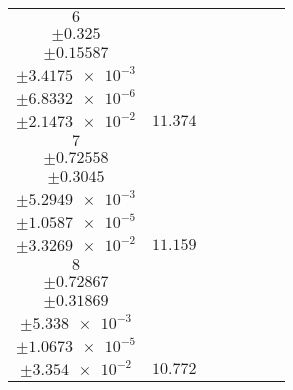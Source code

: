 \documentclass[8pt]{article}
\begin{document}
\begin{longtable}[l]{c c c c c c c}
$\num{6}$ & \begin{tabular}[c]{@{}c@{}}$\num{131.67}$ \\ $\pm\num{0.325}$\end{tabular} & \begin{tabular}[c]{@{}c@{}}$\num{-0.3028}$ \\ $\pm\num{0.15587}$\end{tabular} & \begin{tabular}[c]{@{}c@{}}$\num{2.7486e+3}$ \\ $\pm\num{3.4175e-3}$\end{tabular} & \begin{tabular}[c]{@{}c@{}}$\num{5.4957}$ \\ $\pm\num{6.8332e-6}$\end{tabular} & \begin{tabular}[c]{@{}c@{}}$\num{7.6878}$ \\ $\pm\num{2.1473e-2}$\end{tabular} & $\num{11.374}$\\
$\num{7}$ & \begin{tabular}[c]{@{}c@{}}$\num{129.11}$ \\ $\pm\num{0.72558}$\end{tabular} & \begin{tabular}[c]{@{}c@{}}$\num{-0.20546}$ \\ $\pm\num{0.3045}$\end{tabular} & \begin{tabular}[c]{@{}c@{}}$\num{2.7535e+3}$ \\ $\pm\num{5.2949e-3}$\end{tabular} & \begin{tabular}[c]{@{}c@{}}$\num{5.5056}$ \\ $\pm\num{1.0587e-5}$\end{tabular} & \begin{tabular}[c]{@{}c@{}}$\num{7.6507}$ \\ $\pm\num{3.3269e-2}$\end{tabular} & $\num{11.159}$\\
$\num{8}$ & \begin{tabular}[c]{@{}c@{}}$\num{125.09}$ \\ $\pm\num{0.72867}$\end{tabular} & \begin{tabular}[c]{@{}c@{}}$\num{-1.702}$ \\ $\pm\num{0.31869}$\end{tabular} & \begin{tabular}[c]{@{}c@{}}$\num{2.7589e+3}$ \\ $\pm\num{5.338e-3}$\end{tabular} & \begin{tabular}[c]{@{}c@{}}$\num{5.5164}$ \\ $\pm\num{1.0673e-5}$\end{tabular} & \begin{tabular}[c]{@{}c@{}}$\num{7.9016}$ \\ $\pm\num{3.354e-2}$\end{tabular} & $\num{10.772}$\\

\end{longtable}
\end{document}
